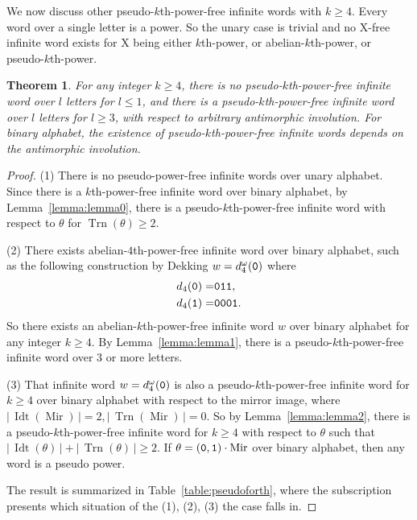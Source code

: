 \documentclass[12pt]{article}
\def\abs#1{{|\,#1\,|}}
\def\mirror{{\operatorname{Mir}}}
\def\id{{\operatorname{Idt}}}
\def\tr{{\operatorname{Trn}}}
\def\mtt#1{{\tt #1}}
\newtheorem{theorem}{Theorem}
\begin{document}
We now discuss other pseudo-$k$th-power-free infinite words with
$k\geq 4$. Every word over a single letter is a power. So the unary
case is trivial and no X-free infinite word exists for X being
either $k$th-power, or abelian-$k$th-power, or pseudo-$k$th-power.


\begin{theorem}
For any integer $k\geq 4$, there is no pseudo-$k$th-power-free
infinite word over $l$ letters for $l\leq 1$, and there is a
pseudo-$k$th-power-free infinite word over $l$ letters for $l\geq
3$, with respect to arbitrary antimorphic involution. For binary
alphabet, the existence of pseudo-$k$th-power-free infinite words
depends on the antimorphic involution.
\end{theorem}
\begin{proof}
(1) There is no pseudo-power-free infinite words over unary
alphabet. Since there is a $k$th-power-free infinite word over
binary alphabet, by Lemma~\ref{lemma:lemma0}, there is a
pseudo-$k$th-power-free infinite word with respect to $\theta$ for
$\tr(\theta)\geq 2$.

(2) There exists abelian-$4$th-power-free infinite word over binary
alphabet, such as the following construction by Dekking
\cite{Dekking1979} $w=d_4^\omega(\mtt0)$ where
\begin{align*}
d_4(\mtt0)=&\mtt0\mtt1\mtt1, \\
d_4(\mtt1)=&\mtt0\mtt0\mtt0\mtt1.
\end{align*}
So there exists an abelian-$k$th-power-free infinite word $w$ over
binary alphabet for any integer $k\geq 4$. By
Lemma~\ref{lemma:lemma1}, there is a pseudo-$k$th-power-free
infinite word over $3$ or more letters.

(3) That infinite word $w=d_4^\omega(\mtt0)$ is also a
pseudo-$k$th-power-free infinite word for $k\geq 4$ over binary
alphabet with respect to the mirror image, where
$\abs{\id(\mirror)}=2,\abs{\tr(\mirror)}=0$. So by
Lemma~\ref{lemma:lemma2}, there is a pseudo-$k$th-power-free
infinite word for $k\geq 4$ with respect to $\theta$ such that
$\abs{\id(\theta)}+\abs{\tr(\theta)}\geq 2$. If
$\theta=(\mtt0,\mtt1)\cdot\mirror$ over binary alphabet, then any
word is a pseudo power.

The result is summarized in Table~\ref{table:pseudoforth}, where the
subscription presents which situation of the (1), (2), (3) the case
falls in.
\end{proof}
\end{document}
